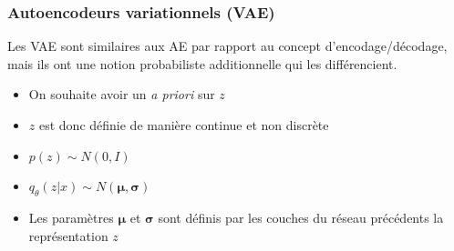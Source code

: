 \documentclass{beamer}
\begin{document}
	\begin{frame}
		\frametitle{Autoencodeurs variationnels (VAE)}
		Les VAE \citep{kingma2013autoencoding} sont similaires aux AE par rapport au concept d'encodage/décodage, mais ils ont une notion probabiliste additionnelle qui les différencient.
		
		\begin{itemize}
			\item On souhaite avoir un \textit{a priori} sur $z$
			\item $z$ est donc définie de manière continue et non discrète
			\item $p(z) \sim N(0,I)$
			\item $q_{\theta}(z|x) \sim N(\boldsymbol{\mu}, \boldsymbol{\sigma})$
			\item Les paramètres $\boldsymbol{\mu}$ et $\boldsymbol{\sigma}$ sont définis par les couches du réseau précédents la représentation $z$
		\end{itemize}
	\end{frame}
\end{document}
